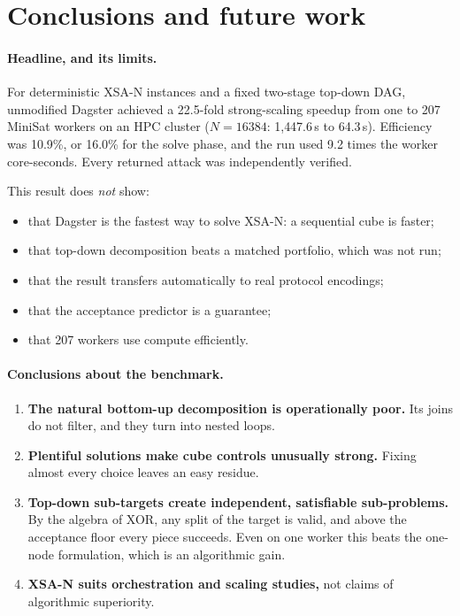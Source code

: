 \documentclass[11pt,a4paper]{article}
\newcommand{\XSA}{\textsf{XSA-N}}
\begin{document}
\section{Conclusions and future work}
\label{sec:conclusions}

\paragraph{Headline, and its limits.}
For deterministic \XSA{} instances and a fixed two-stage top-down DAG, unmodified Dagster
achieved a 22.5-fold strong-scaling speedup from one to 207 MiniSat workers on an HPC cluster
($N=16384$: 1{,}447.6\,s to 64.3\,s). Efficiency was 10.9\%, or 16.0\% for the solve phase,
and the run used 9.2 times the worker core-seconds. Every returned attack was independently
verified.

This result does \emph{not} show:
\begin{itemize}
\item that Dagster is the fastest way to solve \XSA{}: a sequential cube is faster;
\item that top-down decomposition beats a matched portfolio, which was not run;
\item that the result transfers automatically to real protocol encodings;
\item that the acceptance predictor is a guarantee;
\item that 207 workers use compute efficiently.
\end{itemize}

\paragraph{Conclusions about the benchmark.}
\begin{enumerate}
\item \textbf{The natural bottom-up decomposition is operationally poor.} Its joins do not
      filter, and they turn into nested loops.
\item \textbf{Plentiful solutions make cube controls unusually strong.} Fixing almost every
      choice leaves an easy residue.
\item \textbf{Top-down sub-targets create independent, satisfiable sub-problems.} By the
      algebra of XOR, any split of the target is valid, and above the acceptance floor every
      piece succeeds. Even on one worker this beats the one-node formulation, which is an
      algorithmic gain.
\item \textbf{\XSA{} suits orchestration and scaling studies,} not claims of algorithmic
      superiority.
\end{enumerate}
\end{document}
